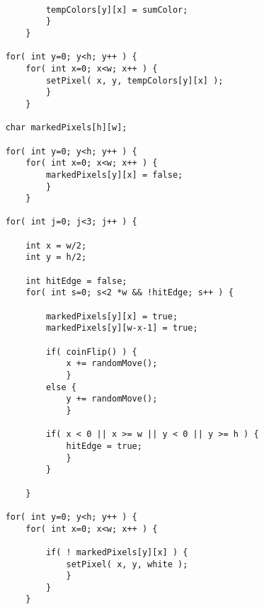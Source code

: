 \documentclass[12pt]{article}
\begin{document}
{\begin{center}
\begin{minipage}{10cm}
\begin{verbatim}
            
            tempColors[y][x] = sumColor;
            }
        }
    
    for( int y=0; y<h; y++ ) {
        for( int x=0; x<w; x++ ) {
            setPixel( x, y, tempColors[y][x] );
            }
        }       

    char markedPixels[h][w];
    
    for( int y=0; y<h; y++ ) {
        for( int x=0; x<w; x++ ) {
            markedPixels[y][x] = false;
            }
        }
    
    for( int j=0; j<3; j++ ) {
        
        int x = w/2;
        int y = h/2;
        
        int hitEdge = false;
        for( int s=0; s<2 *w && !hitEdge; s++ ) {
        
            markedPixels[y][x] = true;
            markedPixels[y][w-x-1] = true;

            if( coinFlip() ) {
                x += randomMove();
                }
            else {
                y += randomMove();
                }
            
            if( x < 0 || x >= w || y < 0 || y >= h ) {
                hitEdge = true;
                }
            }

        }
    
    for( int y=0; y<h; y++ ) {
        for( int x=0; x<w; x++ ) {
    
            if( ! markedPixels[y][x] ) {
                setPixel( x, y, white );
                }
            }
        }
\end{verbatim}
\end{minipage}
\end{center}
\vspace*{\fill}
}
\end{document}
